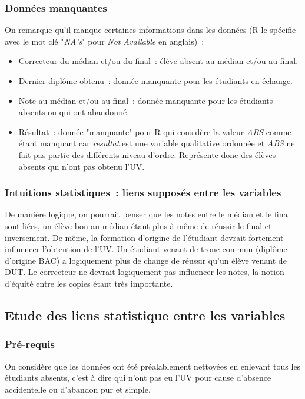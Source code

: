 \documentclass[a4paper,11pt]{report}
\begin{document}
\subsubsection{Données manquantes}
On remarque qu'il manque certaines informations dans les données (R le spécifie avec le mot clé "\textit{NA's}" pour \textit{Not Available} en anglais)~:
\begin{itemize}
	\item Correcteur du médian et/ou du final~: élève absent au médian et/ou au final.
	\item Dernier diplôme obtenu~: donnée manquante pour les étudiants en échange.
	\item Note au médian et/ou au final~: donnée manquante pour les étudiants absents ou qui ont abandonné.
	\item Résultat~: donnée "manquante" pour R qui considère la valeur \textit{ABS} comme étant manquant car \textit{resultat} est une variable qualitative ordonnée et \textit{ABS} ne fait pas partie des différents niveau d'ordre. Représente donc des élèves absents qui n'ont pas obtenu l'UV.
\end{itemize}


\subsubsection{Intuitions statistiques~: liens supposés entre les variables}
De manière logique, on pourrait penser que les notes entre le médian et le final sont liées, un élève bon au médian étant plus à même de réussir le final et inversement. De même, la formation d'origine de l'étudiant devrait fortement influencer l'obtention de l'UV. Un étudiant venant de tronc commun (diplôme d'origine BAC) a logiquement plus de change de réussir qu'un élève venant de DUT. Le correcteur ne devrait logiquement pas influencer les notes, la notion d'équité entre les copies étant très importante.




\subsection{Etude des liens statistique entre les variables}

\subsubsection{Pré-requis}
On considère que les données ont été préalablement nettoyées en enlevant tous les étudiants absents, c'est à dire qui n'ont pas eu l'UV pour cause d'absence accidentelle ou d'abandon pur et simple.
\end{document}
